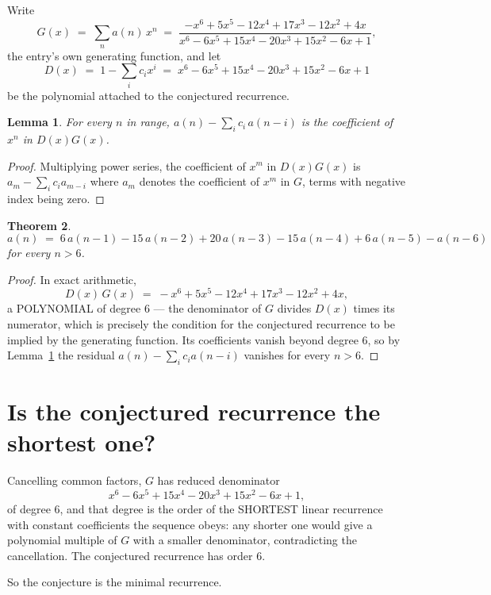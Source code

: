 \documentclass[11pt,a4paper]{article}
\theoremstyle{plain}
\newtheorem{theorem}{Theorem}
\newtheorem{lemma}[theorem]{Lemma}
\theoremstyle{definition}
\begin{document}
Write
\[
G(x)\;=\;\sum_{n}a(n)\,x^{n}\;=\;\frac{- x^{6} + 5 x^{5} - 12 x^{4} + 17 x^{3} - 12 x^{2} + 4 x}{x^{6} - 6 x^{5} + 15 x^{4} - 20 x^{3} + 15 x^{2} - 6 x + 1},
\]
the entry's own generating function, and let
\[
D(x)\;=\;1-\sum_i c_i x^{i}\;=\;x^{6} - 6 x^{5} + 15 x^{4} - 20 x^{3} + 15 x^{2} - 6 x + 1
\]
be the polynomial attached to the conjectured recurrence.

\begin{lemma}\label{lem:key}
For every $n$ in range, $a(n)-\sum_i c_i\,a(n-i)$ is the coefficient of $x^{n}$ in
$D(x)G(x)$.
\end{lemma}

\begin{proof}
Multiplying power series, the coefficient of $x^{m}$ in $D(x)G(x)$ is
$a_m-\sum_i c_i a_{m-i}$ where $a_m$ denotes the coefficient of $x^{m}$ in $G$, terms with
negative index being zero.
\end{proof}

\begin{theorem}
\[
a(n)\;=\;6\,a(n-1) - 15\,a(n-2) + 20\,a(n-3) - 15\,a(n-4) + 6\,a(n-5) - a(n-6)
\]
for every $n>6$.
\end{theorem}

\begin{proof}
In exact arithmetic,
\[
D(x)\,G(x)\;=\;- x^{6} + 5 x^{5} - 12 x^{4} + 17 x^{3} - 12 x^{2} + 4 x,
\]
a POLYNOMIAL of degree $6$ --- the denominator of $G$ divides $D(x)$ times its numerator,
which is precisely the condition for the conjectured recurrence to be implied by the
generating function. Its coefficients vanish beyond degree $6$, so by
Lemma~\ref{lem:key} the residual $a(n)-\sum_ic_ia(n-i)$ vanishes for every
$n>6$.
\end{proof}

\section{Is the conjectured recurrence the shortest one?}

Cancelling common factors, $G$ has reduced denominator
\[
x^{6} - 6 x^{5} + 15 x^{4} - 20 x^{3} + 15 x^{2} - 6 x + 1,
\]
of degree $6$, and that degree is the order of the SHORTEST linear recurrence with
constant coefficients the sequence obeys: any shorter one would give a polynomial multiple of
$G$ with a smaller denominator, contradicting the cancellation. The conjectured recurrence has
order $6$.

So the conjecture is the minimal recurrence.
\end{document}
